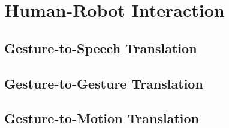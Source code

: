\section{Human-Robot Interaction}

\subsection{Gesture-to-Speech Translation}

\subsection{Gesture-to-Gesture Translation}

\subsection{Gesture-to-Motion Translation}